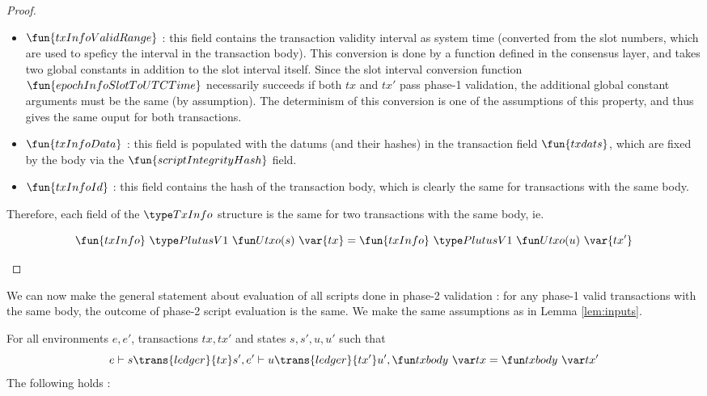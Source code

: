 \begin{property}
\begin{proof}
\begin{itemize}
\begin{itemize}
        \item $\fun{txInfoValidRange}$ : this field contains the transaction
        validity interval as system time (converted from the slot numbers, which are
        used to speficy the interval in the transaction body). This conversion is
        done by a function defined in the consensus layer, and takes two global
        constants in addition to the slot interval itself. Since the slot interval
        conversion function $\fun{epochInfoSlotToUTCTime}$ necessarily
        succeeds if both $tx$ and $tx'$ pass phase-1 validation, the additional
        global constant arguments must be the same (by assumption). The determinism of this conversion
        is one of the assumptions of this property, and thus gives the same ouput
        for both transactions.

        \item $\fun{txInfoData}$ : this field is populated with the datums (and their
        hashes) in the transaction field $\fun{txdats}$, which are fixed by the body
        via the $\fun{scriptIntegrityHash}$ field.

        \item $\fun{txInfoId}$ : this field contains the hash of the transaction body,
        which is clearly the same for transactions with the same body.
      \end{itemize}

      Therefore, each field of the $\TxInfo$ structure is
      the same for two transactions with the same body, ie.

      \[ \fun{txInfo}~\PlutusVI~\Utxo(s)~\var{tx} = \fun{txInfo}~\PlutusVI~\Utxo(u)~\var{tx'}\]

    \end{itemize}
\end{proof}

We can now make the general statement about evaluation of all scripts done in
phase-2 validation : for any phase-1 valid transactions with the same body,
the outcome of phase-2 script evaluation is the same. We make the same assumptions
as in Lemma \ref{lem:inputs}.

\begin{corollary}
  For all environments $e, e'$, transactions $tx, tx'$ and states $s, s', u, u'$ such that
  \begin{equation*}
    e\vdash s\trans{ledger}{tx}s', \\
    e'\vdash u\trans{ledger}{tx'}u', \\
    \txbody{tx} = \txbody{tx'}
  \end{equation*}
  The following holds :


\end{corollary}
\end{property}
